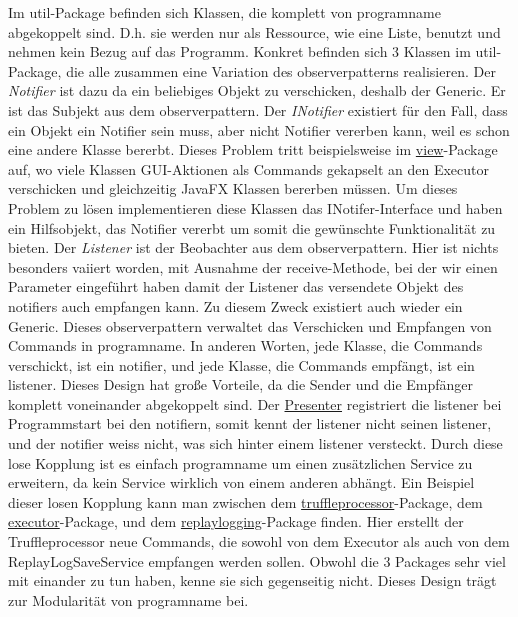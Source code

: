 \medskip
Im util-Package befinden sich Klassen, die komplett von \gls{programname} abgekoppelt
sind. D.h. sie werden nur als Ressource, wie eine Liste, benutzt und nehmen kein
Bezug auf das Programm.\newline
Konkret befinden sich 3 Klassen im util-Package, die alle zusammen eine
Variation des \gls{observerpattern}s realisieren. Der \textit{Notifier} ist dazu da
ein beliebiges Objekt zu verschicken, deshalb der Generic. Er ist das Subjekt aus
dem \gls{observerpattern}.
\newline
\newline
Der \textit{INotifier} existiert für den Fall, dass ein
Objekt ein Notifier sein muss, aber nicht Notifier vererben kann, weil es
schon eine andere Klasse bererbt. Dieses Problem tritt beispielsweise im
\hyperref[subsec:view]{view}-Package auf, wo viele Klassen GUI-Aktionen als Commands
gekapselt an den Executor verschicken und gleichzeitig JavaFX Klassen bererben müssen.
Um dieses Problem zu lösen implementieren diese Klassen das INotifer-Interface
und haben ein Hilfsobjekt, das Notifier vererbt um somit die gewünschte Funktionalität zu
bieten.
\newline
\newline
Der \textit{Listener} ist der Beobachter aus dem \gls{observerpattern}. Hier ist nichts
besonders vaiiert worden, mit Ausnahme der receive-Methode, bei der wir einen Parameter eingeführt
haben damit der Listener das versendete Objekt des \gls{notifier}s auch empfangen kann.
Zu diesem Zweck existiert auch wieder ein Generic.
\newline
\newline
Dieses \gls{observerpattern} verwaltet das Verschicken und Empfangen von Commands in
\gls{programname}. In anderen Worten, jede Klasse, die Commands verschickt, ist ein
\gls{notifier}, und jede Klasse, die Commands empfängt, ist ein \gls{listener}. Dieses Design
hat große Vorteile, da die Sender und die Empfänger komplett voneinander abgekoppelt
sind. Der \hyperref[subsec:presenter]{Presenter} registriert die \gls{listener} bei Programmstart 
bei den \gls{notifier}n, somit kennt der \gls{listener} nicht seinen \gls{listener}, und der
\gls{notifier} weiss nicht, was sich hinter einem \gls{listener} versteckt. Durch diese lose
Kopplung ist es einfach \gls{programname} um einen zusätzlichen Service zu erweitern,
da kein Service wirklich von einem anderen abhängt.
\newline
\newline
Ein Beispiel dieser losen Kopplung kann man zwischen dem
\hyperref[subsubsec:truffleprocessor]{truffleprocessor}-Package, dem
\hyperref[subsubsec:executor]{executor}-Package, und dem
\hyperref[subsubsec:replaylogging]{replaylogging}-Package finden. Hier erstellt
der Truffleprocessor neue Commands, die sowohl von dem Executor als auch von dem
ReplayLogSaveService empfangen werden sollen. Obwohl die 3 Packages sehr viel
mit einander zu tun haben, kenne sie sich gegenseitig nicht. Dieses Design
trägt zur Modularität von \gls{programname} bei.

